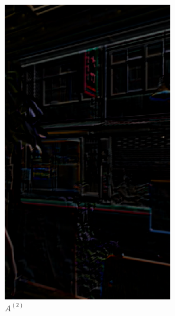 \documentclass[12pt]{article}
\theoremstyle{definition}
\begin{document}
\begin{figure}[ht]
\begin{subfigure}[b]{0.3\textwidth}
         \includegraphics[width=\textwidth]{ch3_figures/video_after_2.png}
         \caption{$A^{(2)}$}
         \label{fig:video_after_2}
     \end{subfigure}
     \hfill
     \begin{subfigure}[b]{0.3\textwidth}
         \centering

\end{subfigure}
\end{figure}
\end{document}
